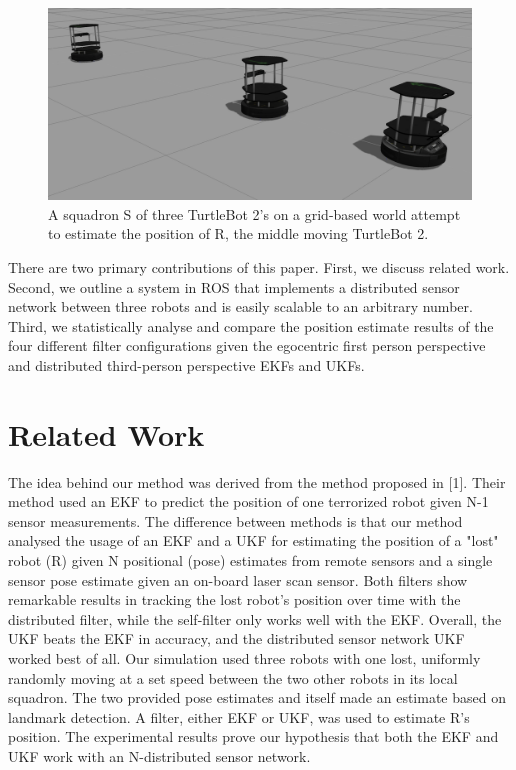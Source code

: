 \documentclass[conference]{IEEEtran} \usepackage[T1]{fontenc} \usepackage[backend=biber, style=ieee]{biblatex}
\begin{document}
\begin{figure}
\label{pic1} 
\centering 
\includegraphics[scale=.2]{sim1}
\caption{A squadron S of three TurtleBot 2's on a grid-based world attempt to estimate the position of R, the middle moving TurtleBot 2.}
\end{figure}

There are two primary contributions of this paper. First, we discuss related work. Second, we outline a system in ROS that implements a distributed sensor network 
between three robots and is easily scalable to an arbitrary number. Third, we statistically analyse and compare the position estimate results of the four different 
filter configurations given the egocentric first person perspective and distributed third-person perspective EKFs and UKFs.

\section{Related Work} \label{Related Work}
The idea behind our method was derived from the method proposed in [1]. Their method used an EKF to predict the position
of one terrorized robot given N-1 sensor measurements. The difference between methods is that our method analysed the
usage of an EKF and a UKF for estimating the position of a "lost" robot (R) given N positional (pose) estimates from remote
sensors and a single sensor pose estimate given an on-board laser scan sensor. Both filters show remarkable results in tracking 
the lost robot's position over time with the distributed filter, while the self-filter only works well with the EKF. Overall, 
the UKF beats the EKF in accuracy, and the distributed sensor network UKF worked best of all. Our simulation used three robots 
with one lost, uniformly randomly moving at a set speed between the two other robots in its local squadron. The two provided 
pose estimates and itself made an estimate based on landmark detection. A filter, either EKF or UKF, was used to estimate R's 
position. The experimental results prove our hypothesis that both the EKF and UKF work with an N-distributed sensor network.
\end{document}

